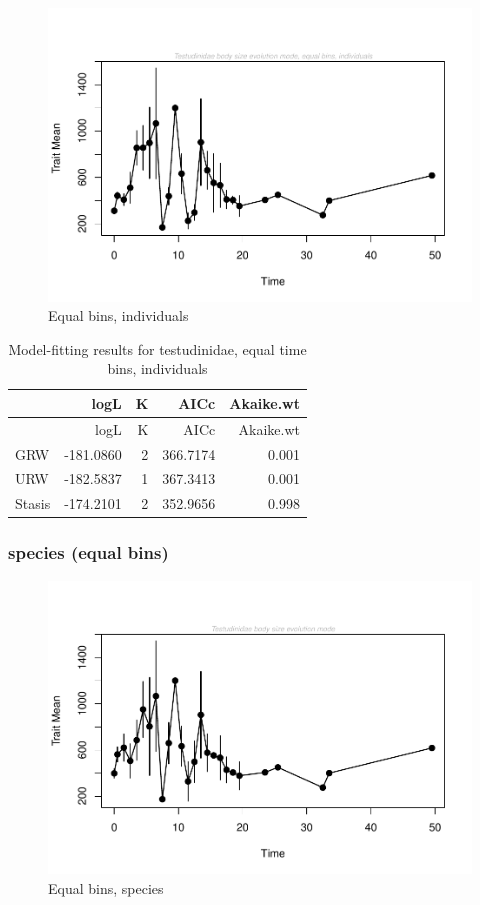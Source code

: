 \documentclass[]{article}
\begin{document}
\begin{figure}[htbp]
\centering
\includegraphics{MA_JJ_files/figure-latex/Play around with time bins, larger equal bins, individuals-1.pdf}
\caption{Equal bins, individuals}
\end{figure}

\begin{longtable}[]{@{}lrrrr@{}}
\caption{Model-fitting results for testudinidae, equal time bins,
individuals}\tabularnewline
\toprule
& logL & K & AICc & Akaike.wt\tabularnewline
\midrule
\endfirsthead
\toprule
& logL & K & AICc & Akaike.wt\tabularnewline
\midrule
\endhead
GRW & -181.0860 & 2 & 366.7174 & 0.001\tabularnewline
URW & -182.5837 & 1 & 367.3413 & 0.001\tabularnewline
Stasis & -174.2101 & 2 & 352.9656 & 0.998\tabularnewline
\bottomrule
\end{longtable}

\newpage

\subsubsection{species (equal bins)}\label{species-equal-bins}

\begin{figure}[htbp]
\centering
\includegraphics{MA_JJ_files/figure-latex/Play around with time bins, equal bin, species level-1.pdf}
\caption{Equal bins, species}
\end{figure}
\end{document}
